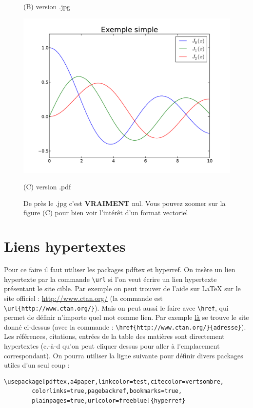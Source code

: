 \begin{figure}[htb]
\begin{minipage}[b]{.33\linewidth}
  \vspace{0.1cm}
  \centerline{(B) version .jpg}\medskip
\end{minipage}%
\hfill
\begin{minipage}[b]{.33\linewidth}
  \centering
 \centerline{\includegraphics[clip,viewport=400 300 520 450,width=1.\textwidth]{example_simple_pdf}}
  \vspace{0.1cm}
  \centerline{(C) version .pdf}\medskip
\end{minipage}%
\caption{De pr\`es le .jpg c'est \textbf{VRAIMENT} nul. Vous pouvez zoomer sur la figure (C) pour bien voir l'intérêt d'un
format vectoriel}
\label{fig:ma_figure_zoom}
\end{figure}


\section{Liens hypertextes}

Pour ce faire il faut utiliser les packages pdftex et hyperref.
On insère un lien hypertexte par la commande 
\lstinline+\url+ si l'on veut écrire un lien 
hypertexte présentant le site cible. 
Par exemple on peut trouver de l'aide sur \LaTeX{} sur le site officiel : 
\url{http://www.ctan.org/} (la commande est \lstinline+\url{http://www.ctan.org/}+). 
Mais on peut aussi le faire avec  \lstinline+\href+, qui permet de définir n'importe quel mot 
comme lien. 
Par exemple \href{http://www.ctan.org/}{là} se trouve le site donné ci-dessus 
(avec la commande : \lstinline+\href{http://www.ctan.org/}{adresse}+).  
Les références, citations, entrées de la table des matières sont directement hypertextes 
(c.-à-d qu'on peut cliquer dessus pour aller à l'emplacement correspondant).
On pourra utiliser la ligne suivante pour définir divers packages utiles  d'un seul coup :
\begin{lstlisting}
\usepackage[pdftex,a4paper,linkcolor=test,citecolor=vertsombre,
	    colorlinks=true,pagebackref,bookmarks=true, 
	    plainpages=true,urlcolor=freeblue]{hyperref}
\end{lstlisting}

